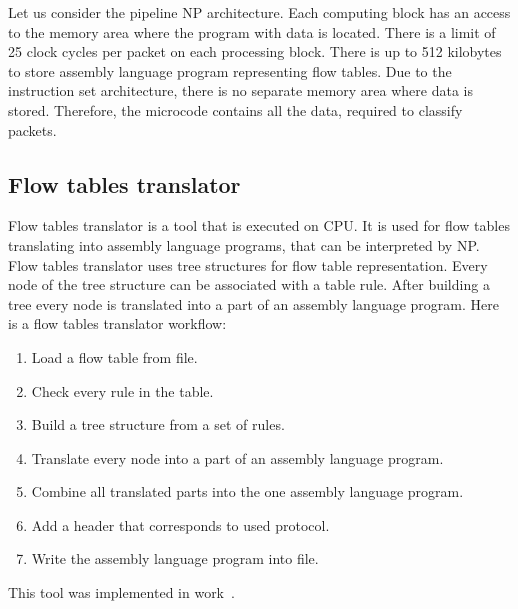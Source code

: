 \documentclass[conference]{IEEEtran}
\begin{document}
        Let us consider the pipeline NP architecture. 
        Each computing block has an access to the memory area where the program with data is located.
        There is a limit of 25 clock cycles per packet on each processing block.
        There is up to 512 kilobytes to store assembly language program representing flow tables.
        Due to the instruction set architecture, there is no separate memory area where data is stored. 
        Therefore, the microcode contains all the data, required to classify packets.
        
        \subsection{Flow tables translator}
            Flow tables translator is a tool that is executed on CPU. It is used for flow tables translating
            into assembly language programs, that can be interpreted by NP. Flow tables translator uses 
            tree structures for flow table representation.
            Every node of the tree structure can be associated with a table rule. 
            After building a tree every node is translated into a part of an assembly
            language program. Here is a flow tables translator workflow:
            \begin{enumerate}
                \item Load a flow table from file.
                \item Check every rule in the table.
                \item Build a tree structure from a set of rules.
                \item Translate every node into a part of an assembly language program.
                \item Combine all translated parts into the one assembly language program.
                \item Add a header that corresponds to used protocol.
                \item Write the assembly language program into file.
            \end{enumerate}

            This tool was implemented in work~\cite{andrewmonetec}.
\end{document}
